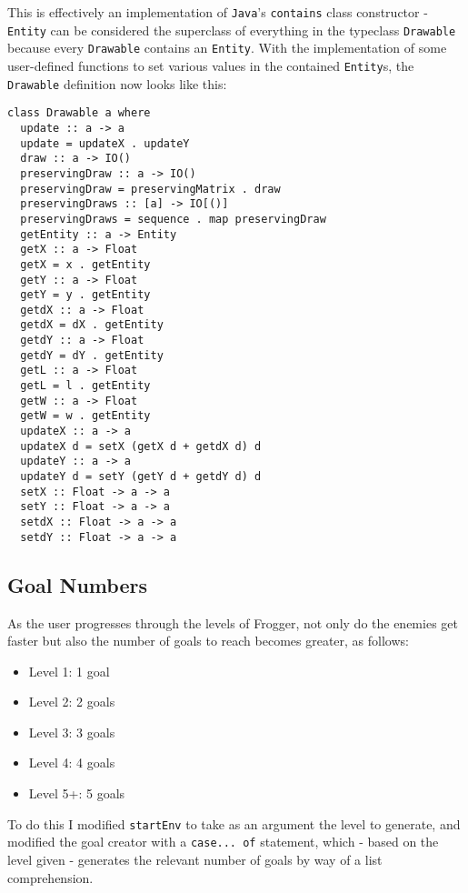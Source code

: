\documentclass[12pt, a4paper]{report}
\begin{document}
\par

This is effectively an implementation of \verb|Java|'s \verb|contains| class constructor - \verb|Entity| can be considered the superclass of everything in the typeclass \verb|Drawable| because every \verb|Drawable| contains an \verb|Entity|.
With the implementation of some user-defined functions to set various values in the contained \verb|Entity|s, the \verb|Drawable| definition now looks like this:

\begin{lstlisting}
class Drawable a where
  update :: a -> a
  update = updateX . updateY
  draw :: a -> IO()
  preservingDraw :: a -> IO()
  preservingDraw = preservingMatrix . draw
  preservingDraws :: [a] -> IO[()]
  preservingDraws = sequence . map preservingDraw
  getEntity :: a -> Entity
  getX :: a -> Float
  getX = x . getEntity
  getY :: a -> Float
  getY = y . getEntity
  getdX :: a -> Float
  getdX = dX . getEntity
  getdY :: a -> Float
  getdY = dY . getEntity
  getL :: a -> Float
  getL = l . getEntity
  getW :: a -> Float
  getW = w . getEntity
  updateX :: a -> a
  updateX d = setX (getX d + getdX d) d
  updateY :: a -> a
  updateY d = setY (getY d + getdY d) d
  setX :: Float -> a -> a
  setY :: Float -> a -> a
  setdX :: Float -> a -> a
  setdY :: Float -> a -> a
\end{lstlisting}

\subsection{Goal Numbers}

As the user progresses through the levels of Frogger, not only do the enemies get faster but also the number of goals to reach becomes greater, as follows:

\begin{itemize}
  \item Level 1: 1 goal
  \item Level 2: 2 goals
  \item Level 3: 3 goals
  \item Level 4: 4 goals
  \item Level 5+: 5 goals
\end{itemize}

To do this I modified \verb|startEnv| to take as an argument the level to generate, and modified the goal creator with a \verb|case... of| statement, which - based on the level given - generates the relevant number of goals by way of a list comprehension.
\end{document}
